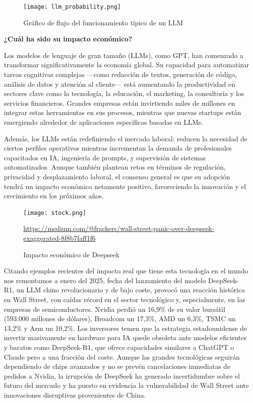 \documentclass{article}
\begin{document}
\begin{figure}[H] %
\centering
\texttt{[image: llm\_probability.png]}
\caption{Gráfico de flujo del funcionamiento típico de un LLM} 
\cite{llm-stats}
\label{tab:LLM_Graph}
\end{figure}

\textbf{¿Cuál ha sido su impacto económico?} 

Los modelos de lenguaje de gran tamaño (LLMs), como GPT, han comenzado a transformar significativamente la economía global. Su capacidad para automatizar tareas cognitivas complejas —como redacción de textos, generación de código, análisis de datos y atención al cliente— está aumentando la productividad en sectores clave como la tecnología, la educación, el marketing, la consultoría y los servicios financieros. Grandes empresas están invirtiendo miles de millones en integrar estas herramientas en sus procesos, mientras que nuevas startups están emergiendo alrededor de aplicaciones específicas basadas en LLMs.

Además, los LLMs están redefiniendo el mercado laboral: reducen la necesidad de ciertos perfiles operativos mientras incrementan la demanda de profesionales capacitados en IA, ingeniería de prompts, y supervisión de sistemas automatizados. Aunque también plantean retos en términos de regulación, privacidad y desplazamiento laboral, el consenso general es que su adopción tendrá un impacto económico netamente positivo, favoreciendo la innovación y el crecimiento en los próximos años.


\begin{figure}[H]
\centering
\texttt{[image: stock.png]}
\caption{Impacto económico de Deepseek}
\url{https://medium.com/@frackers/wall-street-panic-over-deepseek-exaggerated-8f8b7faff1f6}
\label{tab:LLM_Graph}
\end{figure}

Citando ejemplos recientes del impacto real que tiene esta tecnología en el mundo nos remontamos a enero del 2025, fecha del lanzamiento del modelo DeepSeek-R1, un LLM chino revolucionario y de bajo coste, provocó una reacción histórica en Wall Street, con caídas récord en el sector tecnológico y, especialmente, en las empresas de semiconductores. Nvidia perdió un 16,9\% de su valor bursátil (593.000 millones de dólares), Broadcom un 17,3\%, AMD un 6,3\%, TSMC un 13,2\% y Arm un 10,2\%. Los inversores temen que la estrategia estadounidense de invertir masivamente en hardware para IA quede obsoleta ante modelos eficientes y baratos como DeepSeek-R1, que ofrece capacidades similares a ChatGPT o Claude pero a una fracción del coste. Aunque las grandes tecnológicas seguirán dependiendo de chips avanzados y no se prevén cancelaciones inmediatas de pedidos a Nvidia, la irrupción de DeepSeek ha generado incertidumbre sobre el futuro del mercado y ha puesto en evidencia la vulnerabilidad de Wall Street ante innovaciones disruptivas provenientes de China.
\end{document}
